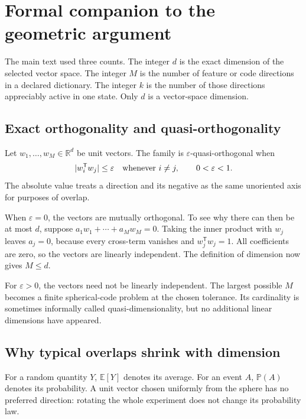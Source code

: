 \documentclass[
  aps,
  reprint,
  superscriptaddress,
  floatfix,
  nofootinbib,
  longbibliography
]{revtex4-2}
\newcommand{\R}{\mathbb{R}}
\newcommand{\E}{\mathbb{E}}
\newcommand{\Prob}{\mathbb{P}}
\newcommand{\T}{^{\mathsf T}}
\begin{document}
\section{Formal companion to the geometric argument}
\label{app:geometry}

The main text used three counts.  The integer $d$ is the exact dimension of
the selected vector space.  The integer $M$ is the number of feature or code
directions in a declared dictionary.  The integer $k$ is the number of those
directions appreciably active in one state.  Only $d$ is a vector-space
dimension.

\subsection{Exact orthogonality and quasi-orthogonality}

Let $w_1,\ldots,w_M\in\R^d$ be unit vectors.  The family is
$\varepsilon$-quasi-orthogonal when
\begin{equation}
 |w_i\T w_j|\leq\varepsilon
 \quad\hbox{whenever }i\ne j,
 \qquad 0<\varepsilon<1.
 \label{eq:quasi-app}
\end{equation}
The absolute value treats a direction and its negative as the same
unoriented axis for purposes of overlap.

When $\varepsilon=0$, the vectors are mutually orthogonal.  To see why there
can then be at most $d$, suppose
$a_1w_1+\cdots+a_Mw_M=0$.  Taking the inner product with $w_j$ leaves
$a_j=0$, because every cross-term vanishes and $w_j\T w_j=1$.  All
coefficients are zero, so the vectors are linearly independent.  The
definition of dimension now gives $M\leq d$.

For $\varepsilon>0$, the vectors need not be linearly independent.  The
largest possible $M$ becomes a finite spherical-code problem at the chosen
tolerance.  Its cardinality is sometimes informally called
quasi-dimensionality, but no additional linear dimensions have appeared.

\subsection{Why typical overlaps shrink with dimension}

For a random quantity $Y$, $\E[Y]$ denotes its average.  For an event $A$,
$\Prob(A)$ denotes its probability.  A unit vector chosen uniformly from the
sphere has no preferred direction: rotating the whole experiment does not
change its probability law.
\end{document}

